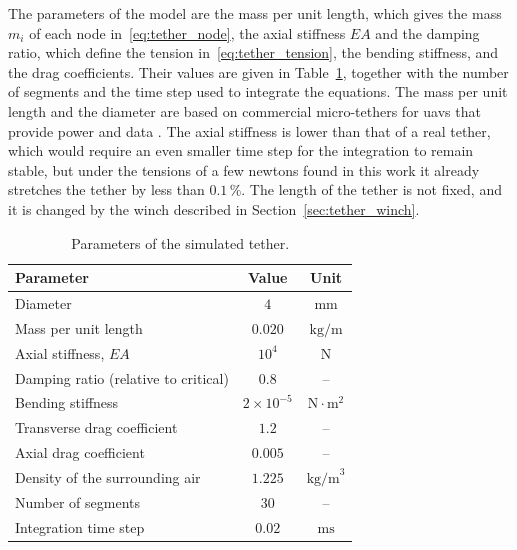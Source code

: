 

The parameters of the model are the mass per unit length, which gives the mass $m_i$ of each node in~\eqref{eq:tether_node}, the axial stiffness $EA$ and the damping ratio, which define the tension in~\eqref{eq:tether_tension}, the bending stiffness, and the drag coefficients. Their values are given in Table~\ref{tab:tether_parameters}, together with the number of segments and the time step used to integrate the equations. The mass per unit length and the diameter are based on commercial micro-tethers for \glspl{uav} that provide power and data \cite{elistair_safet2,linden_microtethers}. The axial stiffness is lower than that of a real tether, which would require an even smaller time step for the integration to remain stable, but under the tensions of a few newtons found in this work it already stretches the tether by less than $0.1\,\%$. The length of the tether is not fixed, and it is changed by the winch described in Section~\ref{sec:tether_winch}.

\begin{table}[!htbp]
    \centering
    \caption{Parameters of the simulated tether.}
    \label{tab:tether_parameters}
    \begin{tabular}{lcc}
        \toprule
        \textbf{Parameter} & \textbf{Value} & \textbf{Unit} \\
        \midrule
        Diameter & $4$ & $\text{mm}$ \\
        Mass per unit length & $0.020$ & $\text{kg/m}$ \\
        Axial stiffness, $EA$ & $10^4$ & $\text{N}$ \\
        Damping ratio (relative to critical) & $0.8$ & -- \\
        Bending stiffness & $2\times 10^{-5}$ & $\text{N}\cdot\text{m}^2$ \\
        Transverse drag coefficient & $1.2$ & -- \\
        Axial drag coefficient & $0.005$ & -- \\
        Density of the surrounding air & $1.225$ & $\text{kg/m}^3$ \\
        Number of segments & $30$ & -- \\
        Integration time step & $0.02$ & $\text{ms}$ \\
        \bottomrule
    \end{tabular}
\end{table}

